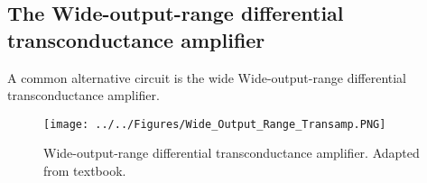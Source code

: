 \subsection{The Wide-output-range differential transconductance amplifier}
A common alternative circuit is the wide Wide-output-range differential transconductance amplifier.

\begin{figure}[H]
    \centering
    \texttt{[image: ../../Figures/Wide\_Output\_Range\_Transamp.PNG]}
    \caption{Wide-output-range differential transconductance amplifier. Adapted from textbook.}
    \label{fig:wide_output_range_transamp}
\end{figure}